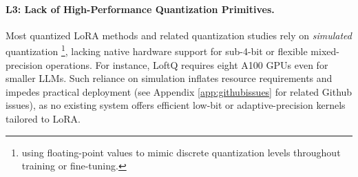 \paragraph{L3: Lack of High-Performance Quantization Primitives.} \label{sec:primlimit}

Most quantized LoRA methods and related quantization studies \cite{li2023loftq, qin2024accurate,shen2020q,bai2020binarybert} rely on \textit{simulated} quantization \footnote{using floating-point values to mimic discrete quantization levels throughout training or fine-tuning.}, lacking native hardware support for sub-4-bit or flexible mixed-precision operations. For instance, LoftQ requires eight A100 GPUs even for smaller LLMs. Such reliance on simulation inflates resource requirements and impedes practical deployment (see Appendix \ref{app:githubissues} for related Github issues), as no existing system offers efficient low-bit or adaptive-precision kernels tailored to LoRA.

